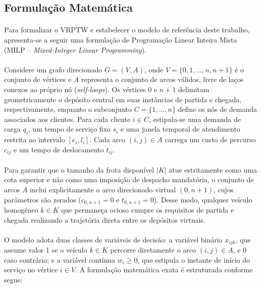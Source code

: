 \subsection{Formulação Matemática}
\label{sec:modelo_milp}

\paragraph{} Para formalizar o VRPTW e estabelecer o modelo de referência deste trabalho, apresenta-se a seguir uma formulação de Programação Linear Inteira Mista (MILP -- \textit{Mixed-Integer Linear Programming}).

\paragraph{} Considere um grafo direcionado $G = (V, A)$, onde $V = \{0, 1, \dots, n, n+1\}$ é o conjunto de vértices e $A$ representa o conjunto de arcos válidos, livre de laços conexos ao próprio nó (\textit{self-loops}). Os vértices $0$ e $n+1$ delimitam geometricamente o depósito central em suas instâncias de partida e chegada, respectivamente, enquanto o subconjunto $C = \{1, \dots, n\}$ define os nós de demanda associados aos clientes. Para cada cliente $i \in C$, estipula-se uma demanda de carga $q_i$, um tempo de serviço fixo $s_i$ e uma janela temporal de atendimento restrita ao intervalo $[e_i, l_i]$. Cada arco $(i, j) \in A$ carrega um custo de percurso $c_{ij}$ e um tempo de deslocamento $t_{ij}$. 

\paragraph{} Para garantir que o tamanho da frota disponível $|K|$ atue estritamente como uma cota superior e não como uma imposição de despacho mandatória, o conjunto de arcos $A$ inclui explicitamente o arco direcionado virtual $(0, n+1)$, cujos parâmetros são zerados ($c_{0, n+1} = 0$ e $t_{0, n+1} = 0$). Desse modo, qualquer veículo homogêneo $k \in K$ que permaneça ocioso cumpre os requisitos de partida e chegada realizando a trajetória direta entre os depósitos virtuais.

\paragraph{} O modelo adota duas classes de variáveis de decisão: a variável binária $x_{ijk}$, que assume valor 1 se o veículo $k \in K$ percorre diretamente o arco $(i, j) \in A$, e 0 caso contrário; e a variável contínua $w_i \ge 0$, que estipula o instante de início do serviço no vértice $i \in V$. A formulação matemática exata é estruturada conforme segue:

